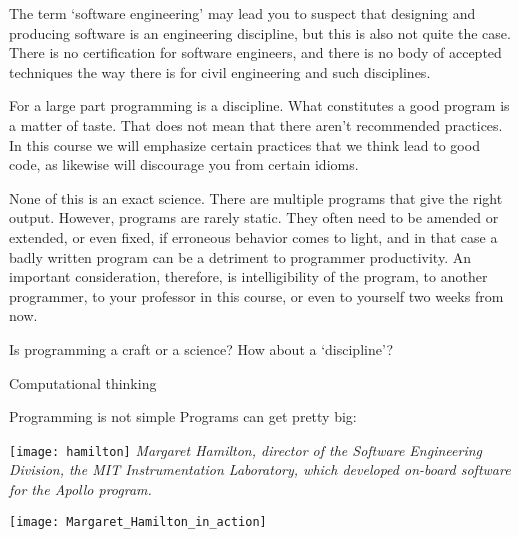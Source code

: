 The term `software engineering' may lead you to suspect
that designing and producing software is an engineering discipline,
but this is also not quite the case.
There is no certification for software engineers, and
there is no body of accepted techniques the way there is
for civil engineering and such disciplines.

For a large part programming is a discipline. What constitutes a
good program is a matter of taste. That does not mean that there
aren't recommended practices. In this course we will emphasize certain
practices that we think lead to good code, as likewise will discourage
you from certain idioms.

None of this is an exact science. There are multiple programs that
give the right output. However, programs are rarely static. They often
need to be amended or extended, or even fixed, if erroneous behavior
comes to light, and in that case a badly written program can be a
detriment to programmer productivity. An important consideration,
therefore, is intelligibility of the program, to another programmer,
to your professor in this course, or even to yourself two weeks from
now.

\begin{slide}{Is programming a craft or a science?}
  \label{sl:programmingcraft}
  How about a `discipline'?
\end{slide}

 {Computational thinking}

\begin{slide}{Programming is not simple}
  \label{sl:hamilton}
  \small
  Programs can get pretty big:

  \begin{multicols}{2}
    \texttt{[image: hamilton]}
    \vfill\columnbreak
    \textsl
    {\small Margaret Hamilton, director of the Software Engineering Division,
    the MIT Instrumentation Laboratory, which developed on-board
    software for the Apollo program.}\par
    \texttt{[image: Margaret\_Hamilton\_in\_action]}
    \vfill\hbox{}\columnbreak
  \end{multicols}



\end{slide}

